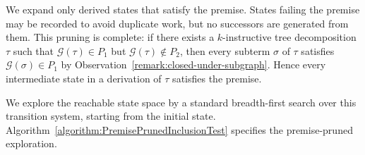 \documentclass[11pt,a4paper]{article}
\newcommand{\treewidthvalue}{k}
\newcommand{\decompositiongraph}[1]{\mathcal{G}(#1)}
\newcommand{\abstractdecomposition}{\tau}
\begin{document}
We expand only derived states that satisfy the premise. States failing the premise may be recorded to avoid duplicate work, but no successors are generated from them. This pruning is complete: if there exists a $\treewidthvalue$-instructive tree decomposition $\abstractdecomposition$ such that $\decompositiongraph{\abstractdecomposition}\in P_1$ but $\decompositiongraph{\abstractdecomposition}\notin P_2$, then every subterm $\sigma$ of $\abstractdecomposition$ satisfies $\decompositiongraph{\sigma}\in P_1$ by Observation~\ref{remark:closed-under-subgraph}. Hence every intermediate state in a derivation of $\abstractdecomposition$ satisfies the premise.

We explore the reachable state space by a standard breadth-first search over this transition system, starting from the initial state.
Algorithm~\ref{algorithm:PremisePrunedInclusionTest} specifies the premise-pruned exploration.
\end{document}
